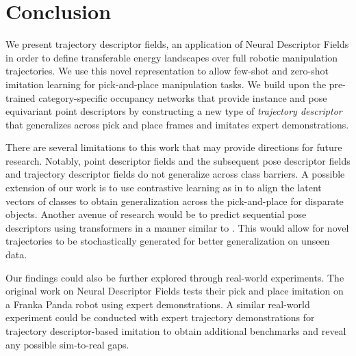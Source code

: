 \documentclass[10pt,twocolumn,letterpaper]{article}
\begin{document}
\section{Conclusion}

We present trajectory descriptor fields, an application of Neural Descriptor Fields \cite{simeonovdu2021ndf} in order to define transferable energy landscapes over full robotic manipulation trajectories. We use this novel representation to allow few-shot and zero-shot imitation learning for pick-and-place manipulation tasks. We build upon the pre-trained category-specific occupancy networks that provide instance and pose equivariant point descriptors by constructing a new type of \textit{trajectory descriptor} that generalizes across pick and place frames and imitates expert demonstrations.

There are several limitations to this work that may provide directions for future research. Notably, point descriptor fields and the subsequent pose descriptor fields and trajectory descriptor fields do not generalize across class barriers. A possible extension of our work is to use contrastive learning as in \cite{kipf2019contrastive} \cite{ma2021learning} to align the latent vectors of classes to obtain generalization across the pick-and-place for disparate objects. Another avenue of research would be to predict sequential pose descriptors using transformers in a manner similar to \cite{giuliari2020transformer}. This would allow for novel trajectories to be stochastically generated for better generalization on unseen data.

Our findings could also be further explored through real-world experiments. The original work on Neural Descriptor Fields \cite{simeonovdu2021ndf} tests their pick and place imitation on a Franka Panda robot using expert demonstrations. A similar real-world experiment could be conducted with expert trajectory demonstrations for trajectory descriptor-based imitation to obtain additional benchmarks and reveal any possible sim-to-real gaps.
\end{document}
